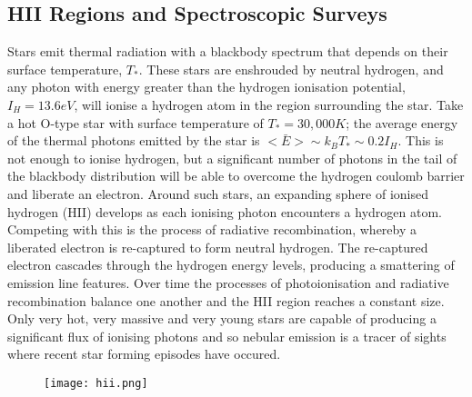 \documentclass{literature}
\begin{document}
\subsection{HII Regions and Spectroscopic Surveys}\label{subsec:HII_regions}
Stars emit thermal radiation with a blackbody spectrum that depends on their surface temperature, $T_{*}$. These stars are enshrouded by neutral hydrogen, and any photon with energy greater than the hydrogen ionisation potential, $I_{H} = 13.6eV$, will ionise a hydrogen atom in the region surrounding the star. Take a hot O-type star with surface temperature of $T_{*} = 30,000 K$; the average energy of the thermal photons emitted by the star is $<\bar{E}> \sim k_{B}T_{*} \sim 0.2I_{H}$. This is not enough to ionise hydrogen, but a significant number of photons in the tail of the blackbody distribution will be able to overcome the hydrogen coulomb barrier and liberate an electron. Around such stars, an expanding sphere of ionised hydrogen (HII) develops as each ionising photon encounters a hydrogen atom. Competing with this is the process of radiative recombination, whereby a liberated electron is re-captured to form neutral hydrogen. The re-captured electron cascades through the hydrogen energy levels, producing a smattering of emission line features. Over time the processes of photoionisation and radiative recombination balance one another and the HII region reaches a constant size. Only very hot, very massive and very young stars are capable of producing a significant flux of ionising photons and so nebular emission is a tracer of sights where recent star forming episodes have occured. \\ 

\begin{figure}[!htp]
\centering
\texttt{[image: hii.png]}
\caption{\footnotesize{\emph{ \citep{Ferguson2014}}}}
\label{fig:hii_regions}
\end{figure} 
\end{document}
